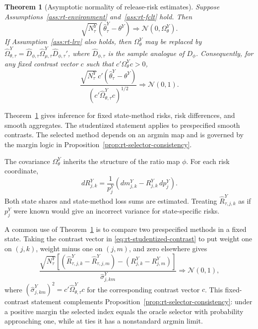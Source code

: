 \documentclass[a4paper, 12pt]{article}
\theoremstyle{plain}
\newtheorem{theorem}{Theorem}
\theoremstyle{remark}
\newcommand{\1}{\mathbf{1}}
\begin{document}
\begin{theorem}[Asymptotic normality of release-risk estimates]
\label{thm:rt-normality}
Suppose Assumptions~\ref{ass:rt-environment} and~\ref{ass:rt-fclt} hold. Then
\begin{equation}
\label{eq:rt-theta-normality}
    \sqrt{N^Y_\tau}
    \left(\widehat\theta^Y_\tau-\theta^Y\right)
    \Rightarrow
    \mathcal N(0,\Omega^Y_\theta) .
\end{equation}
If Assumption~\ref{ass:rt-lrv} also holds, then \(\Omega^Y_\theta\) may be replaced by \(\widehat\Omega^Y_{\theta,\tau}=\widehat D_{\phi,\tau}\widehat\Omega^Y_{\mu,\tau}\widehat D_{\phi,\tau}'\), where \(\widehat D_{\phi,\tau}\) is the sample analogue of \(D_\phi\). Consequently, for any fixed contrast vector \(c\) such that \(c'\Omega^Y_\theta c>0\),
\begin{equation}
\label{eq:rt-studentized-contrast}
    \frac{
    \sqrt{N^Y_\tau}\,c'\left(\widehat\theta^Y_\tau-\theta^Y\right)
    }{
    \left(c'\widehat\Omega^Y_{\theta,\tau}c\right)^{1/2}
    }
    \Rightarrow
    \mathcal N(0,1).
\end{equation}
\end{theorem}

Theorem~\ref{thm:rt-normality} gives inference for fixed state-method risks, risk differences, and smooth aggregates. The studentized statement applies to prespecified smooth contrasts. The selected method depends on an argmin map and is governed by the margin logic in Proposition~\ref{prop:rt-selector-consistency}.

The covariance \(\Omega^Y_\theta\) inherits the structure of the ratio map \(\phi\). For each risk coordinate,
\begin{equation*}
    dR^Y_{j,k}
    =
    \frac{1}{p^Y_j}
    \left(dm^Y_{j,k}-R^Y_{j,k}\,dp^Y_j\right).
\end{equation*}
Both state shares and state-method loss sums are estimated. Treating \(\widehat R^Y_{\tau,j,k}\) as if \(p^Y_j\) were known would give an incorrect variance for state-specific risks.

A common use of Theorem~\ref{thm:rt-normality} is to compare two prespecified methods in a fixed state. Taking the contrast vector in \eqref{eq:rt-studentized-contrast} to put weight one on \((j,k)\), weight minus one on \((j,m)\), and zero elsewhere gives
\begin{equation*}
    \frac{
    \sqrt{N^Y_\tau}
    \left[
        (\widehat R^Y_{\tau,j,k}-\widehat R^Y_{\tau,j,m})
        -(R^Y_{j,k}-R^Y_{j,m})
    \right]
    }{
    \widehat\sigma^Y_{j,km}
    }
    \Rightarrow
    \mathcal N(0,1),
\end{equation*}
where \((\widehat\sigma^Y_{j,km})^2=c'\widehat\Omega^Y_{\theta,\tau}c\) for the corresponding contrast vector \(c\). This fixed-contrast statement complements Proposition~\ref{prop:rt-selector-consistency}: under a positive margin the selected index equals the oracle selector with probability approaching one, while at ties it has a nonstandard argmin limit.
\end{document}
